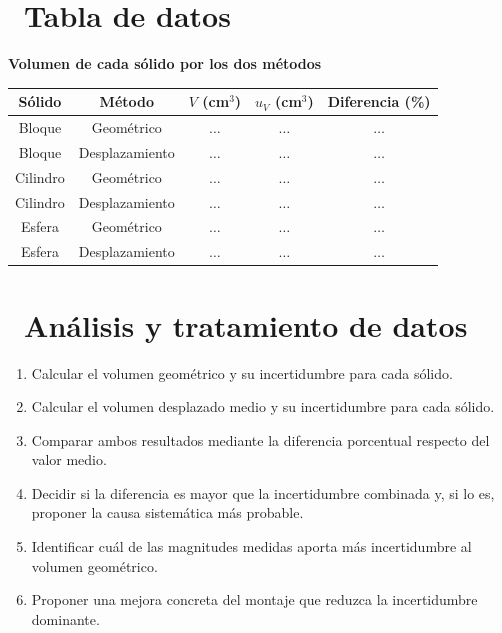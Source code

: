 \documentclass[11pt,a4paper]{article}
\newcommand{\iconotexto}[2]{\textcolor{cyanNeon}{\faIcon{#1}}~#2}
\begin{document}
\section{\iconotexto{table}{Tabla de datos}}

\begin{center}
\begin{minipage}{\linewidth}
\centering
{\small
\textbf{Volumen de cada sólido por los dos métodos}\par\smallskip
\begin{tabular}{@{}ccccc@{}}
\toprule
Sólido & Método & $V$ (cm$^3$) & $u_V$ (cm$^3$) & Diferencia (\%) \\
\midrule
Bloque & Geométrico & $\ldots$ & $\ldots$ & $\ldots$ \\
Bloque & Desplazamiento & $\ldots$ & $\ldots$ & $\ldots$ \\
Cilindro & Geométrico & $\ldots$ & $\ldots$ & $\ldots$ \\
Cilindro & Desplazamiento & $\ldots$ & $\ldots$ & $\ldots$ \\
Esfera & Geométrico & $\ldots$ & $\ldots$ & $\ldots$ \\
Esfera & Desplazamiento & $\ldots$ & $\ldots$ & $\ldots$ \\
\bottomrule
\end{tabular}
}\par{}
\end{minipage}
\end{center}

\section{\iconotexto{calculator}{Análisis y tratamiento de datos}}

\begin{enumerate}[leftmargin=1.4em,itemsep=2pt,topsep=3pt]
  \item Calcular el volumen geométrico y su incertidumbre para cada sólido.
  \item Calcular el volumen desplazado medio y su incertidumbre para cada sólido.
  \item Comparar ambos resultados mediante la diferencia porcentual respecto del valor medio.
  \item Decidir si la diferencia es mayor que la incertidumbre combinada y, si lo es, proponer la causa sistemática más probable.
  \item Identificar cuál de las magnitudes medidas aporta más incertidumbre al volumen geométrico.
  \item Proponer una mejora concreta del montaje que reduzca la incertidumbre dominante.
\end{enumerate}
\end{document}
